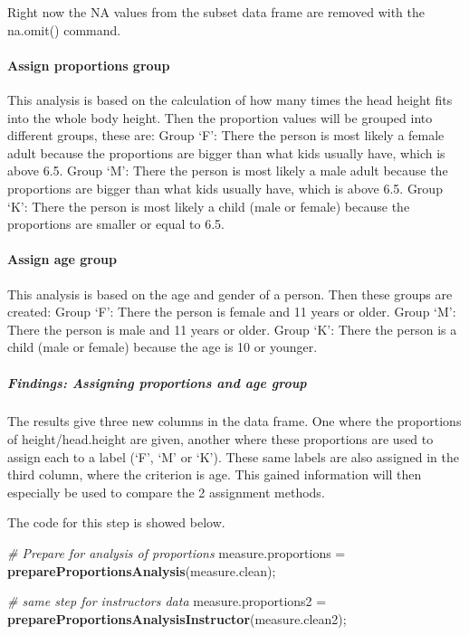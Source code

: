 \documentclass[]{article}
\newenvironment{Shaded}{\begin{snugshade}}{\end{snugshade}}
\newcommand{\CommentTok}[1]{\textcolor[rgb]{0.56,0.35,0.01}{\textit{#1}}}
\newcommand{\KeywordTok}[1]{\textcolor[rgb]{0.13,0.29,0.53}{\textbf{#1}}}
\newcommand{\NormalTok}[1]{#1}
\newcommand{\StringTok}[1]{\textcolor[rgb]{0.31,0.60,0.02}{#1}}
\begin{document}
Right now the NA values from the subset data frame are removed with the
na.omit() command.

\paragraph{Assign proportions group}
\label{sec:appendix-assign-proportions-group}

This analysis is based on the calculation of how many times the head
height fits into the whole body height. Then the proportion values will
be grouped into different groups, these are: Group `F': There the person
is most likely a female adult because the proportions are bigger than
what kids usually have, which is above 6.5. Group `M': There the person
is most likely a male adult because the proportions are bigger than what
kids usually have, which is above 6.5. Group `K': There the person is
most likely a child (male or female) because the proportions are smaller
or equal to 6.5.

\paragraph{Assign age group}
\label{sec:appendix-assign-age-group}

This analysis is based on the age and gender of a person. Then these
groups are created: Group `F': There the person is female and 11 years
or older. Group `M': There the person is male and 11 years or older.
Group `K': There the person is a child (male or female) because the age
is 10 or younger.

\subparagraph{Findings: Assigning proportions and age group}
\label{sec:appendix-findings-assign-age-group}

The results give three new columns in the data frame. One where the
proportions of height/head.height are given, another where these
proportions are used to assign each to a label (`F', `M' or `K'). These
same labels are also assigned in the third column, where the criterion
is age. This gained information will then especially be used to compare
the 2 assignment methods.

The code for this step is showed below.

\begin{Shaded}
\begin{Highlighting}[]
\CommentTok{\# Prepare for analysis of proportions}
\NormalTok{measure.proportions =}\StringTok{ }\KeywordTok{prepareProportionsAnalysis}\NormalTok{(measure.clean);}

\CommentTok{\# same step for instructors data}
\NormalTok{measure.proportions2 =}\StringTok{ }\KeywordTok{prepareProportionsAnalysisInstructor}\NormalTok{(measure.clean2);}
\end{Highlighting}
\end{Shaded}
\end{document}
